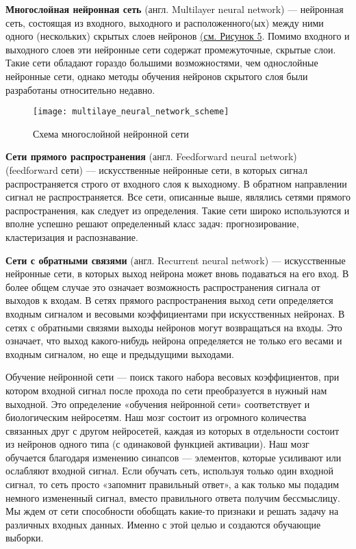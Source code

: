    \textbf{Многослойная нейронная сеть} (англ. Multilayer neural network) — нейронная сеть, состоящая из входного, выходного и расположенного(ых) между ними одного (нескольких) скрытых слоев нейронов \hyperref[fig:multilaye_neural_network_scheme]{(см. Рисунок 5}. Помимо входного и выходного слоев эти нейронные сети содержат промежуточные, скрытые слои. Такие сети обладают гораздо большими возможностями, чем однослойные нейронные сети, однако методы обучения нейронов скрытого слоя были разработаны относительно недавно.
	
    \begin{figure}[ht]
        \centering
        \texttt{[image: multilaye\_neural\_network\_scheme]}
        \caption{Схема многослойной нейронной сети}
        \label{fig:multilaye_neural_network_scheme}
    \end{figure}

    \textbf{Сети прямого распространения} (англ. Feedforward neural network) (feedforward сети) — искусственные нейронные сети, в которых сигнал распространяется строго от входного слоя к выходному. В обратном направлении сигнал не распространяется. Все сети, описанные выше, являлись сетями прямого распространения, как следует из определения. Такие сети широко используются и вполне успешно решают определенный класс задач: прогнозирование, кластеризация и распознавание.

    \textbf{Сети с обратными связями} (англ. Recurrent neural network) — искусственные нейронные сети, в которых выход нейрона может вновь подаваться на его вход. В более общем случае это означает возможность распространения сигнала от выходов к входам. В сетях прямого распространения выход сети определяется входным сигналом и весовыми коэффициентами при искусственных нейронах. В сетях с обратными связями выходы нейронов могут возвращаться на входы. Это означает, что выход какого-нибудь нейрона определяется не только его весами и входным сигналом, но еще и предыдущими выходами.

    Обучение нейронной сети — поиск такого набора весовых коэффициентов, при котором входной сигнал после прохода по сети преобразуется в нужный нам выходной. Это определение «обучения нейронной сети» соответствует и биологическим нейросетям. Наш мозг состоит из огромного количества связанных друг с другом нейросетей, каждая из которых в отдельности состоит из нейронов одного типа (с одинаковой функцией активации). Наш мозг обучается благодаря изменению синапсов — элементов, которые усиливают или ослабляют входной сигнал. Если обучать сеть, используя только один входной сигнал, то сеть просто «запомнит правильный ответ», а как только мы подадим немного измененный сигнал, вместо правильного ответа получим бессмыслицу. Мы ждем от сети способности обобщать какие-то признаки и решать задачу на различных входных данных. Именно с этой целью и создаются обучающие выборки.

